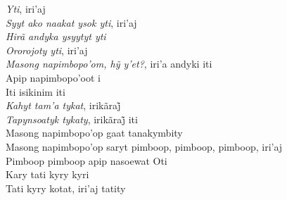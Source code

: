 \begin{linenumbers}\begingroup\raggedright
\noindent \emph{Yti}, iri'aj\\
\emph{Syyt ako naakat ysok yti}, iri'aj\\
\emph{Hirã andyka ysyytyt yti}\\
\emph{Ororojoty yti}, iri'aj\\
\emph{Masong napimbopo’om, hỹ y’et?}, iri’a andyki iti\\
Apip napimbopo'oot i\\
Iti isikinim iti\\
\emph{Kahyt tam’a tykat}, irikãraj̃\\
\emph{Tapynsoatyk tykaty}, irikãraj̃ iti\\
Masong napimbopo'op gaat tanakymbity\\
Masong napimbopo'op saryt pimboop, pimboop, pimboop, iri'aj\\
Pimboop pimboop apip nasoewat Oti\\
Kary tati kyry kyri\\
Tati kyry kotat, iri'aj tatity

\end{linenumbers}\endgroup

\bigskip

